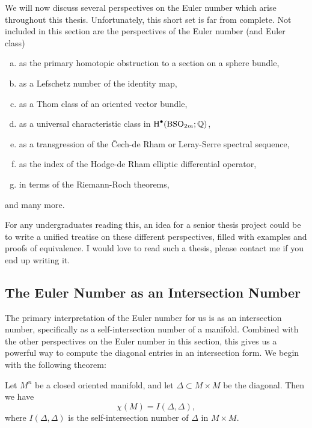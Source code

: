 We will now discuss several perspectives on the Euler number which arise throughout this thesis. Unfortunately, this short set is far from complete. Not included in this section are the perspectives of the Euler number (and Euler class) 
\begin{enumerate}[(a)]
  \item as the primary homotopic obstruction to a section on a sphere bundle,
  \item as a Lefschetz number of the identity map,
  \item as a Thom class of an oriented vector bundle,
  \item as a universal characteristic class in $\operatorname{H}^{\bullet}(\mathrm{BSO}_{2m}; \mathbb{Q})$,
  \item as a transgression of the \v{C}ech-de Rham or Leray-Serre spectral sequence,
  \item as the index of the Hodge-de Rham elliptic differential operator,
  \item in terms of the Riemann-Roch theorems,
\end{enumerate}
and many more. 

\begin{remark*}
  For any undergraduates reading this, an idea for a senior thesis project could be to write a unified treatise on these different perspectives, filled with examples and proofs of equivalence. I would love to read such a thesis, please contact me if you end up writing it.
\end{remark*}

\subsection{The Euler Number as an Intersection Number}\label{sec:euler-number-intersection}

The primary interpretation of the Euler number for us is as an intersection number, specifically as a self-intersection number of a manifold. Combined with the other perspectives on the Euler number in this section, this gives us a powerful way to compute the diagonal entries in an intersection form. We begin with the following theorem: 
\begin{theorem}\label{thm:euler-number-diagonal-intersection}
  Let $M^n$ be a closed oriented manifold, and let $\Delta\subset M\times M$ be the diagonal. 
  Then we have
  \[
    \chi(M) = I(\Delta, \Delta),
  \]
  where $I(\Delta,\Delta)$ is the self-intersection number of $\Delta$ in $M\times M$.
\end{theorem}

